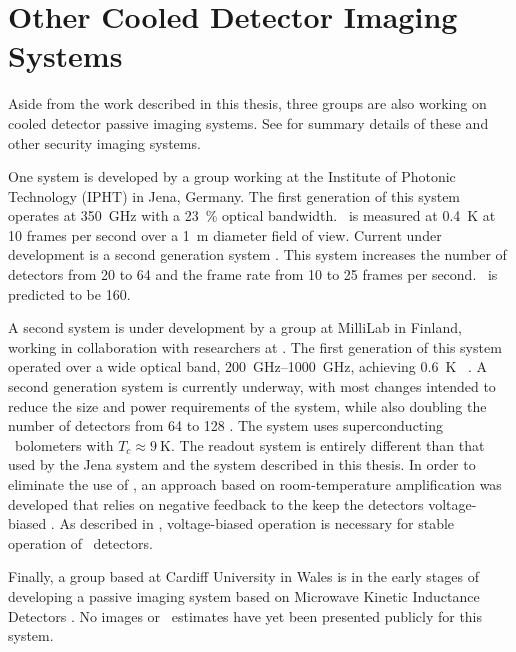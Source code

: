 \section{Other Cooled Detector Imaging Systems}

Aside from the work described in this thesis, three groups are also working on cooled detector passive imaging systems.
See  for summary details of these and other security imaging systems.

One system is developed by a group working at the Institute of Photonic Technology (IPHT) in Jena, Germany.
The first generation of this system \cite{heinz_toward_2011} operates at \SI{350}{\GHz} with a \SI{23}{\percent} optical bandwidth.
\NETD\ is measured at \SI{0.4}{\K} at 10 frames per second over a \SI{1}{\m} diameter field of view.
Current under development is a second generation system \cite{heinz_development_2013,may_next_2013}.
This system increases the number of detectors from 20 to 64 and the frame rate from 10 to 25 frames per second.
\NETD\ is predicted to be \SI{160}{\mK}.

A second system is under development by a group at MilliLab in Finland, working in collaboration with researchers at \NIST.
The first generation of this system operated over a wide optical band, \SIrange{200}{1000}{\GHz}, achieving \SI{0.6}{\K} \NETD\ \cite{grossman_passive_2010}.
A second generation system is currently underway, with most changes intended to reduce the size and power requirements of the system, while also doubling the number of detectors from 64 to 128 \cite{luukanen_applications_2012}.
The system uses superconducting \TES\ bolometers with $T_c \approx \SI{9}{\K}$.
The readout system is entirely different than that used by the Jena system and the system described in this thesis.
In order to eliminate the use of \SQUIDs, an approach based on room-temperature amplification was developed that relies on negative feedback to the keep the detectors voltage-biased \cite{penttila_low-noise_2006}.
As described in , voltage-biased operation is necessary for stable operation of \TES\ detectors.

Finally, a group based at Cardiff University in Wales is in the early stages of developing a passive imaging system \cite{day_broadband_2003} based on Microwave Kinetic Inductance Detectors \cite{wood_kidcam_2011}.
No images or \NETD\ estimates have yet been presented publicly for this system.


